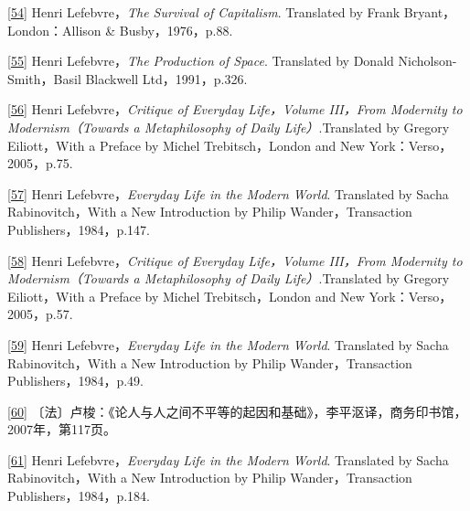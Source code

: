 \documentclass[UTF8, fontset = sourcesans, a4paper, oneside, zihao =
-4, scheme=chinese, no-math, space=true]{ctexbook}
\begin{document}
\protect\hypertarget{part0007_split_004.htmlux5cux23m54}{}{}\protect\hyperlink{part0007_split_003.htmlux5cux23w54}{{[}54{]}}
Henri Lefebvre，\emph{The Survival of Capitalism}. Translated by Frank
Bryant，London：Allison \& Busby，1976，p.88.

\protect\hypertarget{part0007_split_004.htmlux5cux23m55}{}{}\protect\hyperlink{part0007_split_003.htmlux5cux23w55}{{[}55{]}}
Henri Lefebvre，\emph{The Production of Space}. Translated by Donald
Nicholson-Smith，Basil Blackwell Ltd，1991，p.326.

\protect\hypertarget{part0007_split_004.htmlux5cux23m56}{}{}\protect\hyperlink{part0007_split_004.htmlux5cux23w56}{{[}56{]}}
Henri Lefebvre，\emph{Critique of Everyday Life，Volume III，From
Modernity to Modernism（Towards a Metaphilosophy of Daily
Life）}.Translated by Gregory Eiliott，With a Preface by Michel
Trebitsch，London and New York：Verso，2005，p.75.

\protect\hypertarget{part0007_split_004.htmlux5cux23m57}{}{}\protect\hyperlink{part0007_split_004.htmlux5cux23w57}{{[}57{]}}
Henri Lefebvre，\emph{Everyday Life in the Modern World}. Translated by
Sacha Rabinovitch，With a New Introduction by Philip Wander，Transaction
Publishers，1984，p.147.

\protect\hypertarget{part0007_split_004.htmlux5cux23m58}{}{}\protect\hyperlink{part0007_split_004.htmlux5cux23w58}{{[}58{]}}
Henri Lefebvre，\emph{Critique of Everyday Life，Volume III，From
Modernity to Modernism（Towards a Metaphilosophy of Daily
Life）}.Translated by Gregory Eiliott，With a Preface by Michel
Trebitsch，London and New York：Verso，2005，p.57.

\protect\hypertarget{part0007_split_004.htmlux5cux23m59}{}{}\protect\hyperlink{part0007_split_004.htmlux5cux23w59}{{[}59{]}}
Henri Lefebvre，\emph{Everyday Life in the Modern World}. Translated by
Sacha Rabinovitch，With a New Introduction by Philip Wander，Transaction
Publishers，1984，p.49.

\protect\hypertarget{part0007_split_004.htmlux5cux23m60}{}{}\protect\hyperlink{part0007_split_004.htmlux5cux23w60}{{[}60{]}}
〔法〕卢梭：《论人与人之间不平等的起因和基础》，李平沤译，商务印书馆，2007年，第117页。

\protect\hypertarget{part0007_split_004.htmlux5cux23m61}{}{}\protect\hyperlink{part0007_split_004.htmlux5cux23w61}{{[}61{]}}
Henri Lefebvre，\emph{Everyday Life in the Modern World}. Translated by
Sacha Rabinovitch，With a New Introduction by Philip Wander，Transaction
Publishers，1984，p.184.
\end{document}

